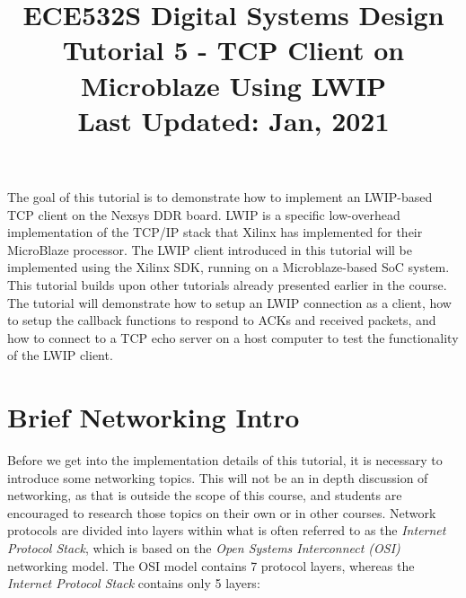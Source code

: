 \documentclass[11pt]{article}
\title{ECE532S Digital Systems Design \\ \vspace{0.4cm}
       \Large Tutorial 5 - TCP Client on Microblaze Using LWIP \\ \vspace{0.4cm}
       \small Last Updated: Jan, 2021}
\author{ }
\date{ }
\begin{document}
\maketitle
\vspace{-1cm}

The goal of this tutorial is to demonstrate how to implement an LWIP-based TCP client on the Nexsys DDR board. LWIP is a specific low-overhead implementation of the TCP/IP stack that Xilinx has implemented for their MicroBlaze processor. The LWIP client introduced in this tutorial will be implemented using the Xilinx SDK, running on a Microblaze-based SoC system. This tutorial builds upon other tutorials already presented earlier in the course. The tutorial will demonstrate how to setup an LWIP connection as a client, how to setup the callback functions to respond to ACKs and received packets, and how to connect to a TCP echo server on a host computer to test the functionality of the LWIP client.

\section*{Brief Networking Intro}
Before we get into the implementation details of this tutorial, it is necessary to introduce some networking topics. This will not be an in depth discussion of networking, as that is outside the scope of this course, and students are encouraged to research those topics on their own or in other courses. Network protocols are divided into layers within what is often referred to as the \textit{Internet Protocol Stack}, which is based on the \textit{Open Systems Interconnect (OSI)} networking model. The OSI model contains 7 protocol layers, whereas the \textit{Internet Protocol Stack} contains only 5 layers:

\renewcommand{\labelitemi}{$\circ$}
\renewcommand{\labelitemii}{$\circ$}
\renewcommand{\labelitemiii}{$\circ$}
\renewcommand{\labelitemiv}{$\circ$}
\end{document}
